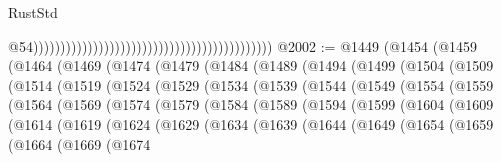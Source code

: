 \begin{lexlean}{RustStd}
\begin{coremodule}
                                                                                            @54))))))))))))))))))))))))))))))))))))))))))))
@2002 := @1449
    (@1454
      (@1459
        (@1464
          (@1469
            (@1474
              (@1479
                (@1484
                  (@1489
                    (@1494
                      (@1499
                        (@1504
                          (@1509
                            (@1514
                              (@1519
                                (@1524
                                  (@1529
                                    (@1534
                                      (@1539
                                        (@1544
                                          (@1549
                                            (@1554
                                              (@1559
                                                (@1564
                                                  (@1569
                                                    (@1574
                                                      (@1579
                                                        (@1584
                                                          (@1589
                                                            (@1594
                                                              (@1599
                                                                (@1604
                                                                  (@1609
                                                                    (@1614
                                                                      (@1619
                                                                        (@1624
                                                                          (@1629
                                                                            (@1634
                                                                              (@1639
                                                                                (@1644
                                                                                  (@1649
                                                                                    (@1654
                                                                                      (@1659
                                                                                        (@1664
                                                                                          (@1669
                                                                                            (@1674

\end{coremodule}
\end{lexlean}

